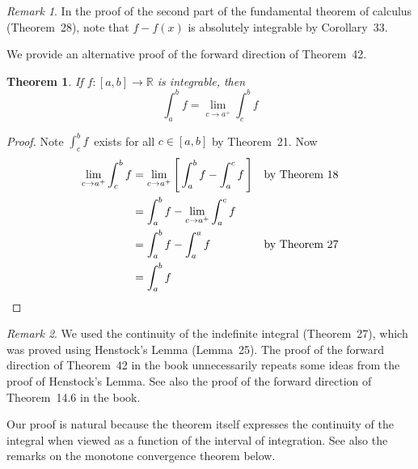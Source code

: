 \documentclass[letterpaper,12pt]{article}
\newcommand{\R}{\mathbb{R}}
\theoremstyle{plain}
\newtheorem*{thm}{Theorem}
\theoremstyle{definition}
\theoremstyle{remark}
\newtheorem*{rmk}{Remark}
\begin{document}
\begin{rmk}
In the proof of the second part of the fundamental theorem of calculus (Theorem~28), note that \(f-f(x)\) is absolutely integrable by Corollary~33.
\end{rmk}

\noindent We provide an alternative proof of the forward direction of Theorem~42.
\begin{thm} If \(f:[a,b]\to\R\) is integrable, then
\[\int_a^b f=\lim_{c\to a^+}\int_c^b f\]
\end{thm}
\begin{proof}
Note \(\int_c^b f\)~exists for all \(c\in[a,b]\) by Theorem~21. Now
\begin{align*}
\lim_{c\to a^+}\int_c^b f&=\lim_{c\to a^+}\left[\,\int_a^b f-\int_a^c f\,\right]&&\text{by Theorem~18}\\
	&=\int_a^b f-\lim_{c\to a^+}\int_a^c f&&\\
	&=\int_a^b f-\int_a^a f&&\text{by Theorem~27}\\
	&=\int_a^b f&&\qedhere
\end{align*}
\end{proof}
\begin{rmk}
We used the continuity of the indefinite integral (Theorem~27), which was proved using Henstock's Lemma (Lemma~25). The proof of the forward direction of Theorem~42 in the book unnecessarily repeats some ideas from the proof of Henstock's Lemma. See also the proof of the forward direction of Theorem~14.6 in the book.

Our proof is natural because the theorem itself expresses the continuity of the integral when viewed as a function of the interval of integration. See also the remarks on the monotone convergence theorem below.
\end{rmk}
\end{document}
